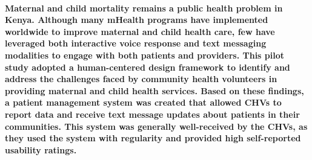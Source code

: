 \paragraph{Maternal and child mortality remains a public health problem in Kenya. Although many mHealth programs have implemented worldwide to improve maternal and child health care, few have leveraged both interactive voice response and text messaging modalities to engage with both patients and providers. This pilot study adopted a human-centered design framework to identify and address the challenges faced by community health volunteers in providing maternal and child health services. Based on these findings, a patient management system was created that allowed CHVs to report data and receive text message updates about patients in their communities. This system was generally well-received by the CHVs, as they used the system with regularity and provided high self-reported usability ratings. }
